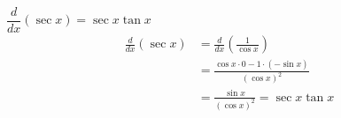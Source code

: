 {$\dfrac{d}{dx}(\sec x) = \sec x \tan x$}
{\begin{align*}
\frac{d}{dx}(\sec x)
&=\frac{d}{dx}\left(\frac{1}{\cos x}\right)\\
&=\frac{\cos x \cdot 0 - 1 \cdot (-\sin x)}{(\cos x)^2}\\
&=\frac{\sin x}{(\cos x)^2} = \sec x \tan x
\end{align*}}
